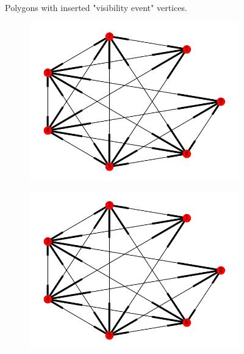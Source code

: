 \documentclass[]{article}  %
\begin{document}
\begin{figure}
\begin{subfigure}{0.33\textwidth}
\end{subfigure}
\caption{Polygons with inserted "visibility event" vertices.}
\end{figure}


\begin{figure}
\centering
\begin{subfigure}{0.33\textwidth}
  \includegraphics[width=\textwidth]{figures/graph1.png}
\end{subfigure}%
\begin{subfigure}{0.33\textwidth}
  \includegraphics[width=\linewidth]{figures/graph3.png}
\end{subfigure}%
\begin{subfigure}{0.33\textwidth}

\end{subfigure}
\end{figure}
\end{document}
